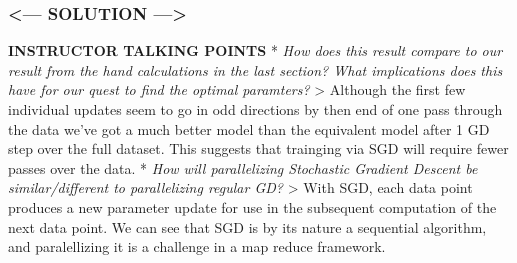 \documentclass[11pt]{article}
\begin{document}
    \hypertarget{solution}{%
\subsubsection{\textless{}--- SOLUTION
---\textgreater{}}\label{solution}}

\textbf{INSTRUCTOR TALKING POINTS} * \emph{How does this result compare
to our result from the hand calculations in the last section? What
implications does this have for our quest to find the optimal
paramters?} \textgreater{} Although the first few individual updates
seem to go in odd directions by then end of one pass through the data
we've got a much better model than the equivalent model after 1 GD step
over the full dataset. This suggests that trainging via SGD will require
fewer passes over the data. * \emph{How will parallelizing Stochastic
Gradient Descent be similar/different to parallelizing regular GD?}
\textgreater{} With SGD, each data point produces a new parameter update
for use in the subsequent computation of the next data point. We can see
that SGD is by its nature a sequential algorithm, and paralellizing it
is a challenge in a map reduce framework.
\end{document}

